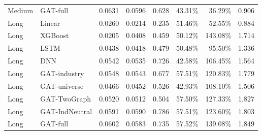 \begin{longtable}{llrrrrrr}
Medium & GAT-full & 0.0631 & 0.0596 & 0.628 & 43.31\% & 36.29\% & 0.906 \\
Long & Linear & 0.0260 & 0.0214 & 0.235 & 51.46\% & 52.55\% & 0.884 \\
Long & XGBoost & 0.0205 & 0.0408 & 0.459 & 50.12\% & 143.08\% & 1.714 \\
Long & LSTM & 0.0438 & 0.0418 & 0.479 & 50.48\% & 95.50\% & 1.336 \\
Long & DNN & 0.0542 & 0.0535 & 0.726 & 42.58\% & 106.45\% & 1.564 \\
Long & GAT-industry & 0.0548 & 0.0543 & 0.677 & 57.51\% & 120.83\% & 1.779 \\
Long & GAT-universe & 0.0466 & 0.0452 & 0.526 & 42.93\% & 108.10\% & 1.506 \\
Long & GAT-TwoGraph & 0.0520 & 0.0512 & 0.504 & 57.50\% & 127.33\% & 1.827 \\
Long & GAT-IndNeutral & 0.0591 & 0.0590 & 0.786 & 57.51\% & 123.60\% & 1.803 \\
Long & GAT-full & 0.0602 & 0.0583 & 0.735 & 57.52\% & 139.08\% & 1.849 \\
\end{longtable}
\endgroup
